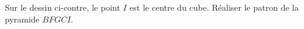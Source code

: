 
\begin{exercice}\label{exo2smath-0187}

    \begin{multicols}{2}
    Sur le dessin ci-contre, le point \( I\) est le centre du cube. Réaliser le patron de la pyramide \( BFGCI\).

 \columnbreak

\begin{center}
   
\end{center}
    \end{multicols}

\end{exercice}
